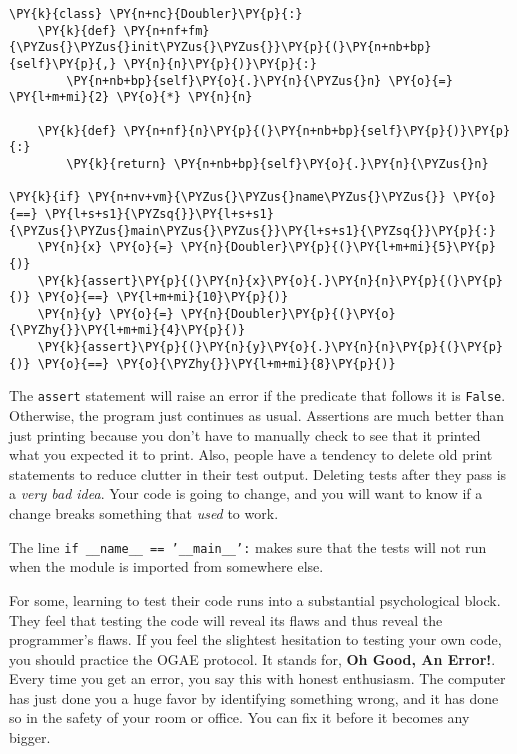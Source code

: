 \begin{Verbatim}[commandchars=\\\{\}]
\PY{k}{class} \PY{n+nc}{Doubler}\PY{p}{:}
    \PY{k}{def} \PY{n+nf+fm}{\PYZus{}\PYZus{}init\PYZus{}\PYZus{}}\PY{p}{(}\PY{n+nb+bp}{self}\PY{p}{,} \PY{n}{n}\PY{p}{)}\PY{p}{:}
        \PY{n+nb+bp}{self}\PY{o}{.}\PY{n}{\PYZus{}n} \PY{o}{=} \PY{l+m+mi}{2} \PY{o}{*} \PY{n}{n}

    \PY{k}{def} \PY{n+nf}{n}\PY{p}{(}\PY{n+nb+bp}{self}\PY{p}{)}\PY{p}{:}
        \PY{k}{return} \PY{n+nb+bp}{self}\PY{o}{.}\PY{n}{\PYZus{}n}

\PY{k}{if} \PY{n+nv+vm}{\PYZus{}\PYZus{}name\PYZus{}\PYZus{}} \PY{o}{==} \PY{l+s+s1}{\PYZsq{}}\PY{l+s+s1}{\PYZus{}\PYZus{}main\PYZus{}\PYZus{}}\PY{l+s+s1}{\PYZsq{}}\PY{p}{:}
    \PY{n}{x} \PY{o}{=} \PY{n}{Doubler}\PY{p}{(}\PY{l+m+mi}{5}\PY{p}{)}
    \PY{k}{assert}\PY{p}{(}\PY{n}{x}\PY{o}{.}\PY{n}{n}\PY{p}{(}\PY{p}{)} \PY{o}{==} \PY{l+m+mi}{10}\PY{p}{)}
    \PY{n}{y} \PY{o}{=} \PY{n}{Doubler}\PY{p}{(}\PY{o}{\PYZhy{}}\PY{l+m+mi}{4}\PY{p}{)}
    \PY{k}{assert}\PY{p}{(}\PY{n}{y}\PY{o}{.}\PY{n}{n}\PY{p}{(}\PY{p}{)} \PY{o}{==} \PY{o}{\PYZhy{}}\PY{l+m+mi}{8}\PY{p}{)}
\end{Verbatim}



The \texttt{assert} statement will raise an error if the predicate that follows it is \texttt{False}.  Otherwise, the program just continues as usual.  Assertions are much better than just printing because you don’t have to manually check to see that it printed what you expected it to print.  Also, people have a tendency to delete old print statements to reduce clutter in their test output.  Deleting tests after they pass is a \emph{very bad idea}.  Your code is going to change, and you will want to know if a change breaks something that \emph{used} to work.


The line \texttt{if \_\_name\_\_ == '\_\_main\_\_':} makes sure that the tests will not run when the module is imported from somewhere else.


For some, learning to test their code runs into a substantial psychological block.  They feel that testing the code will reveal its flaws and thus reveal the programmer’s flaws.  If you feel the slightest hesitation to testing your own code, you should practice the OGAE protocol.  It stands for, \textbf{Oh Good, An Error!}.  Every time you get an error, you say this with honest enthusiasm.  The computer has just done you a huge favor by identifying something wrong, and it has done so in the safety of your room or office.  You can fix it before it becomes any bigger.

